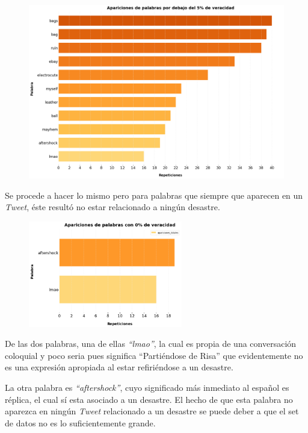 \documentclass[titlepage,a4paper]{article}
\begin{document}
    \begin{figure}[H]
    \centering
    \includegraphics[width=1\textwidth]{graficos/Analisis Lexico Grafico/apariciones_de_palabras_por_debajo_de_5_de_veracidad.png}
    \caption{} 
    \end{figure}
    
    Se procede a hacer lo mismo pero para palabras que siempre que aparecen en un \textit{Tweet}, éste resultó no estar relacionado a ningún desastre.
    
    \begin{figure}[H]
    \centering
    \includegraphics[width=0.6\textwidth]{graficos/Analisis Lexico Grafico/aparaciones_de_palabras_con_0_de_veracidad.png}
    \caption{} 
    \end{figure}
    
    De las dos palabras, una de ellas \textit{``lmao''}, la cual es propia de una conversación  coloquial y poco seria pues significa ``Partiéndose de Risa'' que evidentemente no es una expresión apropiada al estar refiriéndose a un desastre.
    
    La otra palabra es \textit{``aftershock''}, cuyo significado más inmediato al español es réplica, el cual sí esta asociado a un desastre. El hecho de que esta palabra no aparezca en ningún \textit{Tweet} relacionado a un desastre se puede deber a que el set de datos no es lo suficientemente grande.
    
\end{document}
